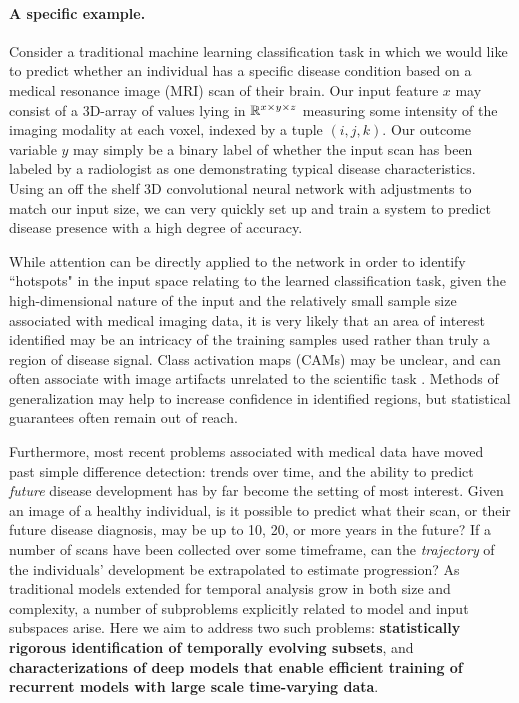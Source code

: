 \paragraph{A specific example.} Consider a traditional machine learning classification task in which we would like to predict whether an individual has a specific disease condition based on a medical resonance image (MRI) scan of their brain. Our input feature $x$ may consist of a 3D-array of values lying in $\mathbb{R}^{x\times y\times z}$ measuring some intensity of the imaging modality at each voxel, indexed by a tuple $(i,j,k)$.
Our outcome variable $y$ may simply be a binary label of whether the input scan has been labeled by a radiologist as one demonstrating typical disease characteristics.
Using an off the shelf 3D convolutional neural network with adjustments to match our input size, we can very quickly set up and train a system to predict disease presence with a high degree of accuracy.

While attention can be directly applied to the network in order to identify ``hotspots" in the input space relating to the learned classification task, 
given the high-dimensional nature of the input
and the relatively small sample size 
associated with medical imaging data, 
it is very likely that an area of interest identified
may be an intricacy of the training samples used rather than truly a region of disease signal.
Class activation maps (CAMs) may be unclear, and can often associate with image artifacts unrelated to the scientific task \citep{adebayo2018sanity}.
Methods of generalization may help to increase confidence in identified regions, but statistical guarantees often remain out of reach.

Furthermore, most recent problems associated with medical data have moved past simple difference detection: trends over time, and the ability to predict {\em future} disease development has by far become the setting of most interest.
Given an image of a healthy individual, is it possible to predict what their scan, or their future disease diagnosis, may be up to 10, 20, or more years in the future?
If a number of scans have been collected over some timeframe, can the \textit{trajectory} of the individuals' development be extrapolated to estimate progression?
As traditional models extended for temporal analysis grow in both size and complexity,
a number of subproblems explicitly related to model and input subspaces arise. Here we aim to address two such problems: \textbf{statistically rigorous identification of temporally evolving subsets}, and \textbf{characterizations of deep models that enable efficient training of recurrent models with large scale time-varying data}.

